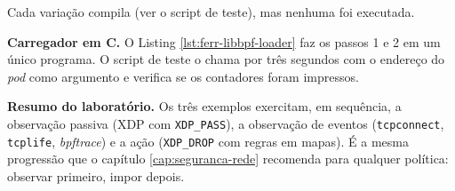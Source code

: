 Cada variação compila (ver o script de teste), mas nenhuma foi executada.

\textbf{Carregador em C.} O Listing \ref{lst:ferr-libbpf-loader} faz os passos 1 e 2
em um único programa. O script de teste o chama por três segundos com o endereço do
\textit{pod} como argumento e verifica se os contadores foram impressos.

\textbf{Resumo do laboratório.} Os três exemplos exercitam, em sequência, a
observação passiva (XDP com \texttt{XDP\_PASS}), a observação de eventos
(\texttt{tcpconnect}, \texttt{tcplife}, \textit{bpftrace}) e a ação (\texttt{XDP\_DROP}
com regras em mapas). É a mesma progressão que o capítulo \ref{cap:seguranca-rede}
recomenda para qualquer política: observar primeiro, impor depois.
